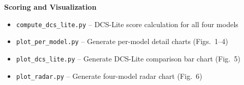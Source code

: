 \documentclass[journal]{IEEEtran}
\begin{document}
\vspace{2pt}
\noindent\textbf{Scoring and Visualization}
\begin{itemize}
    \setlength{\itemsep}{0pt}
    \item \texttt{compute\_dcs\_lite.py} -- DCS-Lite score calculation for all four models
    \item \texttt{plot\_per\_model.py} -- Generate per-model detail charts (Figs.~1--4)
    \item \texttt{plot\_dcs\_lite.py} -- Generate DCS-Lite comparison bar chart (Fig.~5)
    \item \texttt{plot\_radar.py} -- Generate four-model radar chart (Fig.~6)
\end{itemize}
\end{document}
